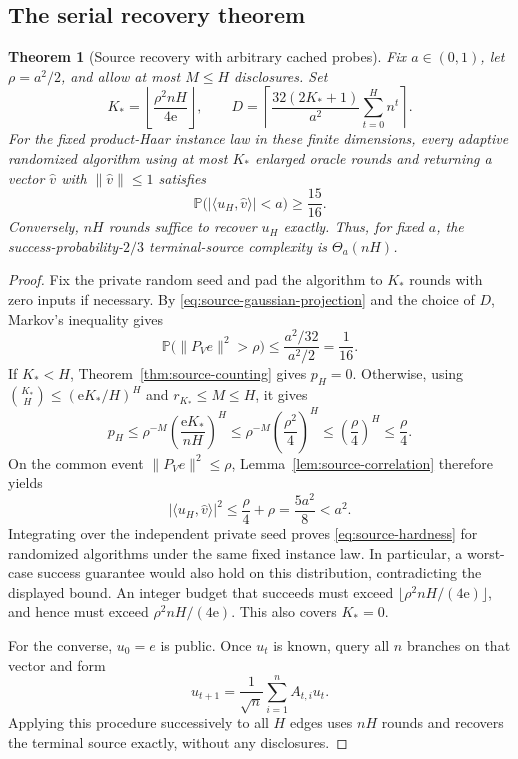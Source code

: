 \documentclass[11pt,letterpaper]{article}
\newtheorem{theorem}{Theorem}[section]
\theoremstyle{definition}
\theoremstyle{remark}
\begin{document}
\subsection{The serial recovery theorem}
\label{app:source:theorem}

\begin{theorem}[Source recovery with arbitrary cached probes]
\label{thm:source-recovery}
Fix $a\in(0,1)$, let $\rho=a^2/2$, and allow at most $M\leq H$
disclosures.  Set
\begin{equation}
  K_* =\left\lfloor\frac{\rho^2nH}{4\mathrm e}\right\rfloor,
  \qquad
  D=\left\lceil\frac{32(2K_*+1)}{a^2}\sum_{t=0}^H n^t\right\rceil.
  \label{eq:source-dimension}
\end{equation}
For the fixed product-Haar instance law in these finite dimensions,
every adaptive randomized algorithm using at most $K_*$ enlarged
oracle rounds and returning a vector $\widehat v$ with
$\|\widehat v\|\leq1$ satisfies
\begin{equation}
  \mathbb P\bigl(|\langle u_H,\widehat v\rangle|<a\bigr)
  \geq\frac{15}{16}.
  \label{eq:source-hardness}
\end{equation}
Conversely, $nH$ rounds suffice to recover $u_H$ exactly.  Thus,
for fixed $a$, the success-probability-$2/3$ terminal-source
complexity is $\Theta_a(nH)$.
\end{theorem}

\begin{proof}
Fix the private random seed and pad the algorithm to $K_*$ rounds
with zero inputs if necessary.  By
\eqref{eq:source-gaussian-projection} and the choice of $D$,
Markov's inequality gives
\[
  \mathbb P\bigl(\|P_Ve\|^2>\rho\bigr)
  \leq\frac{a^2/32}{a^2/2}=\frac1{16}.
\]
If $K_*<H$, Theorem~\ref{thm:source-counting} gives $p_H=0$.
Otherwise, using $\binom{K_*}{H}\leq(\mathrm e K_*/H)^H$
and $r_{K_*}\leq M\leq H$, it gives
\[
  p_H\leq\rho^{-M}
  \left(\frac{\mathrm e K_*}{nH}\right)^H
  \leq\rho^{-M}\left(\frac{\rho^2}{4}\right)^H
  \leq\left(\frac\rho4\right)^H
  \leq\frac\rho4.
\]
On the common event $\|P_Ve\|^2\leq\rho$,
Lemma~\ref{lem:source-correlation} therefore yields
\[
  |\langle u_H,\widehat v\rangle|^2
  \leq\frac\rho4+\rho=\frac{5a^2}{8}<a^2.
\]
Integrating over the independent private seed proves
\eqref{eq:source-hardness} for randomized algorithms under the
same fixed instance law.  In particular, a worst-case success
guarantee would also hold on this distribution, contradicting the
displayed bound.  An integer budget that succeeds must exceed
$\lfloor\rho^2nH/(4\mathrm e)\rfloor$, and hence must exceed
$\rho^2nH/(4\mathrm e)$.  This also covers $K_*=0$.

For the converse, $u_0=e$ is public.  Once $u_t$ is known, query
all $n$ branches on that vector and form
\[
  u_{t+1}=\frac1{\sqrt n}\sum_{i=1}^n A_{t,i}u_t.
\]
Applying this procedure successively to all $H$ edges uses $nH$
rounds and recovers the terminal source exactly, without any
disclosures.
\end{proof}
\end{document}
